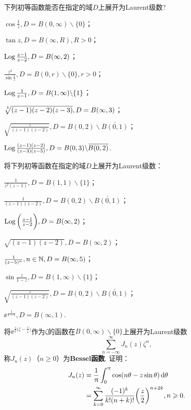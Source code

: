 \begin{xiti}
  \item 下列初等函数能否在指定的域$D$上展开为Laurent级数?
    \begin{enuma}
      \item $\cos\frac1z,D=B(0,\infty)\backslash\{0\}$；
      \item $\tan z,D=B(\infty,R),R>0$；
      \item $\operatorname{Log}\frac{z-1}{z-2},D=B(\infty,2)$；
      \item $\frac{z^2}{\sin\frac1z},D=B(0,r)\backslash\{0\},r>0$；
      \item $\operatorname{Log}\frac1{z-1},D=B(1,\infty)\backslash\{1\}$；
      \item $\sqrt[\leftroot{-1}\uproot{2}3]{(z-1)(z-2)(z-3)},D=B(\infty,3)$；
      \item $\sqrt{\frac z{(z-1)(z-2)}},D=B(0,2)\backslash\bar{B(0,1)}$；
      \item $\operatorname{Log}\frac{(z-1)(z-2)}{(z-3)(z-5)},D=B(0,3)\backslash{}\mkern2mu\overline{\mkern-2muB(0,2)}$.
    \end{enuma}
  \item 将下列初等函数在指定的域$D$上展开为Laurent级数：
    \begin{enuma}
      \item $\frac1{z^2(z-1)},D=B(1,1)\backslash\{1\}$；
      \item $\frac1{(z-1)(z-2)},D=B(0,2)\backslash\bar{B(0,1)}$；
      \item $\operatorname{Log}\bigg(\frac{z-1}{z-2}\bigg),D=B(\infty,2)$；
      \item $\sqrt{(z-1)(z-2)},D=B(\infty,2)$；
      \item $\frac1{(z-5)^n},n\in\mathbb N,D=B(\infty,5)$；
      \item $\sin\frac z{1-z},D=B(1,\infty)\backslash\{1\}$；
      \item $\sqrt{\frac z{(z-1)(z-2)}},D=B(0,2)\backslash\bar{B(0,1)}$；
      \item $\ee^{\frac1{1-z}},D=B(\infty,1)$.
    \end{enuma}
  \item 将$\ee^{\frac z2\big(\zeta-\frac1\zeta\big)}$作为$\zeta$的函数在$B(0,\infty)\backslash\{0\}$上展开为Laurent级数
      \[
        \sum_{n=-\infty}^\infty J_n(z)\zeta^n,
      \]
      称$J_n(z)$（$n\ge0$）为\textbf{Bessel函数}. 证明：
      \begin{align*}
        J_n(z) & = \frac1\pi\int_0^\pi\cos(n\theta-z\sin\theta)\dif \theta\\
        & = \sum_{k=0}^\infty\frac{(-1)^k}{k!(n+k)!}\bigg(\frac z2\bigg)^{n+2k},n\ge0.

\end{align*}
\end{xiti}
